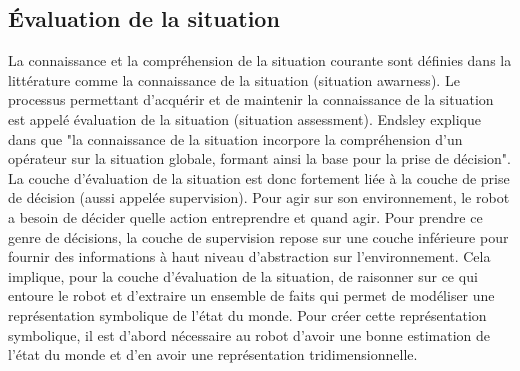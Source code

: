 \documentclass[a4paper,11pt,twoside]{StyleThese}
\begin{document}
\subsection{Évaluation de la situation}
La connaissance et la compréhension de la situation courante sont définies dans la littérature comme la connaissance de la situation (situation awarness). Le processus permettant d'acquérir et de maintenir la connaissance de la situation est appelé évaluation de la situation (situation assessment). Endsley explique dans \cite{endsley1995} que "la connaissance de la situation incorpore la compréhension d'un opérateur sur la situation globale, formant ainsi la base pour la prise de décision". La couche d'évaluation de la situation est donc fortement liée à la couche de prise de décision (aussi appelée supervision). Pour agir sur son environnement, le robot a besoin de décider quelle action entreprendre et quand agir. Pour prendre ce genre de décisions, la couche de supervision repose sur une couche inférieure pour fournir des informations à haut niveau d'abstraction sur l'environnement. Cela implique, pour la couche d'évaluation de la situation, de raisonner sur ce qui entoure le robot et d'extraire un ensemble de faits qui permet de modéliser une représentation symbolique de l'état du monde. Pour créer cette représentation symbolique, il est d'abord nécessaire au robot d'avoir une bonne estimation de l'état du monde et d'en avoir une représentation tridimensionnelle.





\end{document}
